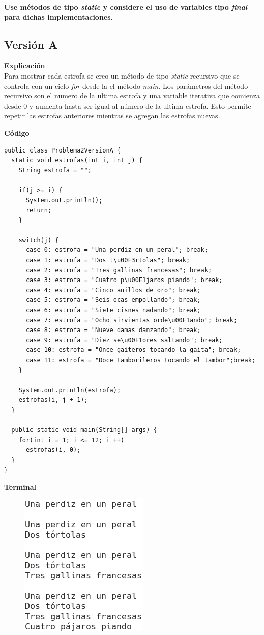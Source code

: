 \documentclass[11pt, twocolumn]{article}
\begin{document}
  \textbf{Use métodos de tipo \textit{static} y considere el uso de variables tipo \textit{final} para dichas implementaciones}.

  \subsection*{Versión A}

  \textbf{Explicación} \\
  Para mostrar cada estrofa se creo un método de tipo \textit{static} recursivo que se controla con un ciclo \textit{for} desde la el método \textit{main}. Los parámetros del método recursivo son el numero de la ultima estrofa y una variable iterativa que comienza desde $0$ y aumenta hasta ser igual al número de la ultima estrofa. Esto permite repetir las estrofas anteriores mientras se agregan las estrofas nuevas. 

  \textbf{Código}
  \begin{lstlisting}
public class Problema2VersionA {
  static void estrofas(int i, int j) {
    String estrofa = "";
    
    if(j >= i) {
      System.out.println();
      return;
    }

    switch(j) {
      case 0: estrofa = "Una perdiz en un peral"; break;
      case 1: estrofa = "Dos t\u00F3rtolas"; break;
      case 2: estrofa = "Tres gallinas francesas"; break;
      case 3: estrofa = "Cuatro p\u00E1jaros piando"; break;
      case 4: estrofa = "Cinco anillos de oro"; break;
      case 5: estrofa = "Seis ocas empollando"; break;
      case 6: estrofa = "Siete cisnes nadando"; break;
      case 7: estrofa = "Ocho sirvientas orde\u00F1ando"; break;
      case 8: estrofa = "Nueve damas danzando"; break;
      case 9: estrofa = "Diez se\u00F1ores saltando"; break;
      case 10: estrofa = "Once gaiteros tocando la gaita"; break;
      case 11: estrofa = "Doce tamborileros tocando el tambor";break;
    }
  
    System.out.println(estrofa);
    estrofas(i, j + 1);    
  }

  public static void main(String[] args) {
    for(int i = 1; i <= 12; i ++)
      estrofas(i, 0);
  }
}  
  \end{lstlisting}
  
  \textbf{Terminal}
  \begin{figure}[ht]
    \includegraphics[width=0.38\columnwidth, center]{P2A.png}
  \end{figure}
\end{document}
